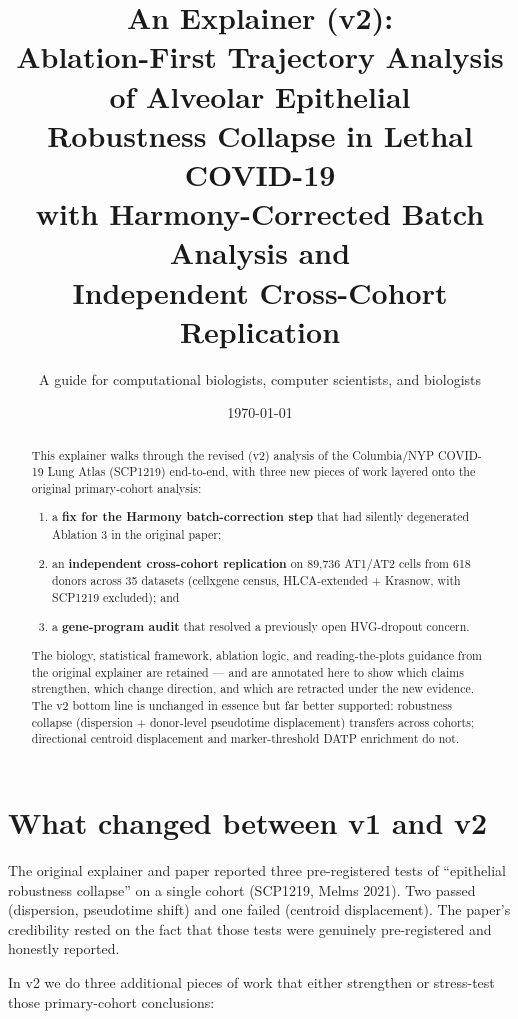 \documentclass[11pt]{article}
\title{An Explainer (v2):\\
Ablation-First Trajectory Analysis of Alveolar Epithelial\\
Robustness Collapse in Lethal COVID-19\\
\large{with Harmony-Corrected Batch Analysis and\\
Independent Cross-Cohort Replication}}
\author{A guide for computational biologists, computer scientists, and biologists}
\date{\today}
\begin{document}
\maketitle

\begin{abstract}
\noindent This explainer walks through the revised (v2) analysis of the Columbia/NYP
COVID-19 Lung Atlas (SCP1219) end-to-end, with three new pieces of work layered onto
the original primary-cohort analysis:
\begin{enumerate}
\item a \textbf{fix for the Harmony batch-correction step} that had silently degenerated
      Ablation 3 in the original paper;
\item an \textbf{independent cross-cohort replication} on 89{,}736 AT1/AT2 cells from
      618 donors across 35 datasets (cellxgene census, HLCA-extended + Krasnow, with
      SCP1219 excluded); and
\item a \textbf{gene-program audit} that resolved a previously open HVG-dropout concern.
\end{enumerate}
The biology, statistical framework, ablation logic, and reading-the-plots guidance from
the original explainer are retained --- and are annotated here to show which claims
strengthen, which change direction, and which are retracted under the new evidence.
The v2 bottom line is unchanged in essence but far better supported: robustness collapse
(dispersion + donor-level pseudotime displacement) transfers across cohorts; directional
centroid displacement and marker-threshold DATP enrichment do not.
\end{abstract}

\tableofcontents
\bigskip

\section{What changed between v1 and v2}

The original explainer and paper reported three pre-registered tests of
``epithelial robustness collapse'' on a single cohort (SCP1219, Melms 2021). Two passed
(dispersion, pseudotime shift) and one failed (centroid displacement). The paper's
credibility rested on the fact that those tests were genuinely pre-registered and
honestly reported.

In v2 we do three additional pieces of work that either strengthen or stress-test those
primary-cohort conclusions:
\end{document}
